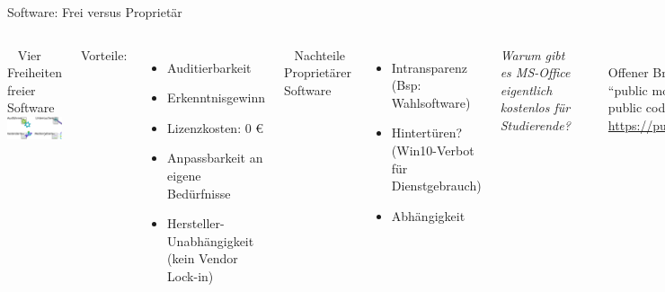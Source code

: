 \documentclass[t]{beamer}
\begin{document}
\begin{frame}[label=wb]{\color{fg}Software: Frei versus Proprietär}

\begin{columns}


~
Vier Freiheiten freier Software\\[4mm]
\includegraphics[width=40mm]{img-src/vier-freiheiten}
\pause

Vorteile:
\begin{itemize}
\item Auditierbarkeit
\item Erkenntnisgewinn
\item Lizenzkosten: 0 €
\item Anpassbarkeit an eigene Bedürfnisse
\item Hersteller-Unabhängigkeit\\[-2mm] {\tiny (kein Vendor Lock-in)}

\end{itemize}


~ 
Nachteile Proprietärer Software
\begin{itemize}
 \item Intransparenz {\tiny (Bsp: Wahlsoftware)}
 \item Hintertüren? {\tiny (Win10-Verbot für Dienstgebrauch)}
 \item Abhängigkeit
\end{itemize}
 \pause
 \bigskip
 
 
 \textit{Warum gibt es MS-Office eigentlich { kostenlos} für Studierende?}
 
 \pause
 \pause
 \medskip
 \rule{\textwidth}{1pt}\\[2mm]
 Offener Brief:\\
 
 "`public money $\Rightarrow$ public code"'\\[2mm]
 
 \url{https://publiccode.eu}


\end{columns}



\end{frame}
\end{document}
